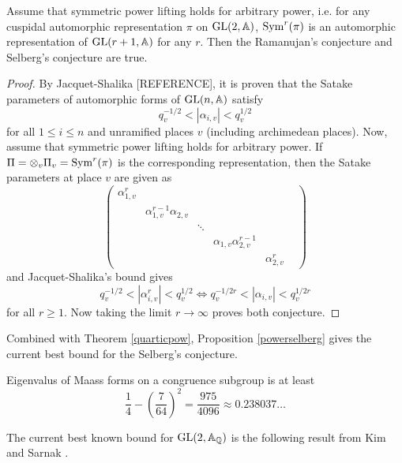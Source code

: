 \begin{proposition}
\label{powerselberg}
Assume that symmetric power lifting holds for arbitrary power, i.e. for any cuspidal automorphic representation $\pi$ on $\operatorname{\mathrm{GL}}(2,\mathbb{A})$,  $\mathrm{Sym}^{r}(\pi)$ is an automorphic representation of $\operatorname{\mathrm{GL}}(r + 1, \mathbb{A})$ for any $r$.
Then the Ramanujan's conjecture and Selberg's conjecture are true.
\end{proposition}
\begin{proof}
By Jacquet-Shalika [REFERENCE], it is proven that the Satake parameters of automorphic forms of $\operatorname{\mathrm{GL}}(n, \mathbb{A})$ satisfy 
$$
q_{v}^{-1/2} < |\alpha_{i,v}| < q_{v}^{1/2}
$$
for all $1\leq i\leq n$ and unramified places $v$ (including archimedean places).
Now, assume that symmetric power lifting holds for arbitrary power. 
If $\Pi = \otimes_{v}\Pi_{v} = \mathrm{Sym}^{r}(\pi)$ is the corresponding representation, then the Satake parameters at place $v$ are given as
$$
\begin{pmatrix}
\alpha_{1, v}^{r} & & & & \\ 
& \alpha_{1, v}^{r-1}\alpha_{2, v} & & & \\ 
& & \ddots & & & \\
& & & \alpha_{1, v}\alpha_{2, v}^{r-1} & \\
& & & & \alpha_{2, v}^{r}
\end{pmatrix}
$$
and Jacquet-Shalika's bound gives 
$$
q_{v}^{-1/2} < |\alpha_{i, v}^{r}| < q_{v}^{1/2} \Longleftrightarrow q_{v}^{-1/2r} < |\alpha_{i, v}| < q_{v}^{1/2r}
$$
for all $r\geq 1$. Now taking the limit $r\to \infty$ proves both conjecture.
\end{proof}

Combined with Theorem \ref{quarticpow}, Proposition \ref{powerselberg} gives the current best bound for the Selberg's conjecture.
\begin{corollary}
Eigenvalus of Maass forms on a congruence subgroup is at least 
$$
\frac{1}{4} - \left(\frac{7}{64}\right)^{2} = \frac{975}{4096} \approx 0.238037\dots
$$
\end{corollary}

The current best known bound for $\operatorname{\mathrm{GL}}(2, \mathbb{A}_{\mathbb{Q}})$ is the following result from Kim and Sarnak \cite{kim2003refined}.

